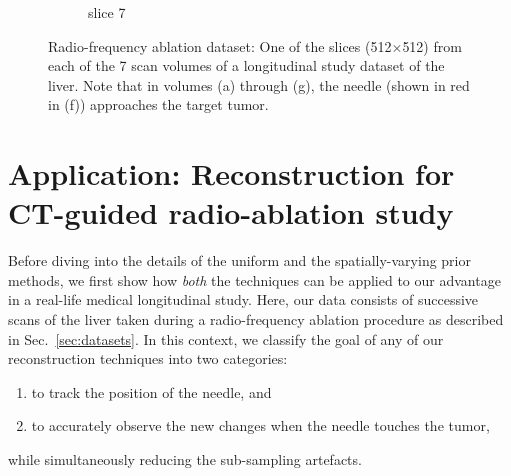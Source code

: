 \documentclass[journal]{IEEEtran}
\begin{document}
\begin{figure}[h!]
\begin{subfigure}[b]{0.23\linewidth}
 \caption{slice 7}
    \end{subfigure}     
     \caption{Radio-frequency ablation dataset: One of the slices (512$\times$512) from each of the 7 scan volumes of a longitudinal study dataset of the liver. Note that in volumes (a) through (g), the needle (shown in red in (f)) approaches the target tumor.} 
\label{fig:RFA2_test_object-prior}
\end{figure}

\section{Application: Reconstruction for CT-guided radio-ablation study}
\label{sec:tmh}
Before diving into the details of the uniform and the
spatially-varying prior methods, we first show how \textit{both} the
techniques can be applied to our advantage in a real-life medical
longitudinal study. Here, our data consists of successive scans of the liver taken
during a radio-frequency ablation procedure as described in Sec.~\ref{sec:datasets}. In this context, we classify the goal of any of our
reconstruction techniques into two categories: 
\begin{enumerate}
\item to track the position of the needle, and%
\item to accurately observe the new changes when the needle touches the tumor,%
\end{enumerate}
while simultaneously reducing the sub-sampling artefacts.
\end{document}
